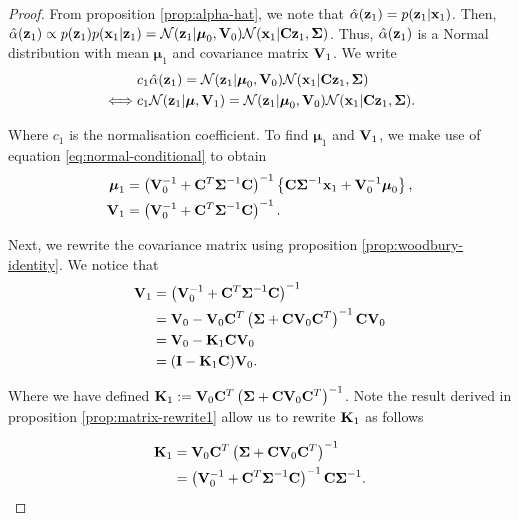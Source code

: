 \documentclass[11pt]{article}
\numberwithin{equation}{section}
\newcommand{\x}{{\bf x}}
\newcommand{\z}{{\bf z}}
\newcommand{\N}{\mathcal{N}}
\begin{document}
\begin{proof}
	From proposition \ref{prop:alpha-hat}, we note that $\hat\alpha(\z_1) = p(\z_1\vert\x_1)$. Then, $\hat\alpha(\z_1) \propto p(\z_1)p(\x_1\vert\z_1) = \N(\z_1 \vert \boldsymbol\mu_0, {\bf V}_0) \N(\x_1\vert {\bf C}\z_1, \boldsymbol\Sigma)$. Thus, $\hat\alpha(\z_1)$ is a Normal distribution with mean $\boldsymbol{\mu}_1$ and covariance matrix ${\bf V}_1$. We write
	\begin{align}
		&c_1 \hat\alpha(\z_1) = \N(\z_1 \vert \boldsymbol\mu_0, {\bf V}_0) \N(\x_1\vert {\bf C}\z_1, \boldsymbol\Sigma)\\
		\iff& c_1 \N(\z_1\vert \boldsymbol\mu, {\bf V}_1) = \N(\z_1 \vert \boldsymbol\mu_0, {\bf V}_0) \N(\x_1\vert {\bf C}\z_1, \boldsymbol\Sigma).
	\end{align}
	
	Where $c_1$ is the normalisation coefficient. To find $\boldsymbol{\mu}_1$ and ${\bf V}_1$, we make use of equation \eqref{eq:normal-conditional} to obtain
	\begin{align}
		\boldsymbol{\mu}_1 &= \left({\bf V}_0^{-1} + {\bf C}^T\boldsymbol{\Sigma}^{-1} {\bf C}\right)^{-1} \left\{{\bf C}\boldsymbol\Sigma^{-1}\x_1 + {\bf V}_0^{-1}\boldsymbol\mu_0\right\},\\
		{\bf V}_1 &= \left({\bf V}_0^{-1} + {\bf C}^T\boldsymbol{\Sigma}^{-1} {\bf C}\right)^{-1}.
	\end{align}
	
	Next, we rewrite the covariance matrix using proposition \ref{prop:woodbury-identity}. We notice that 
	\begin{align}
		{\bf V}_1 &= \left({\bf V}_0^{-1} + {\bf C}^T\boldsymbol{\Sigma}^{-1} {\bf C}\right)^{-1}\\
		&= {\bf V}_0 - {\bf V}_0 {\bf C}^T\left(\boldsymbol\Sigma + {\bf C}{\bf V}_0{\bf C}^T\right)^{-1}{\bf C}{\bf V}_0 \\
		&= {\bf V}_0 - {\bf K}_1{\bf C}{\bf V}_0\\
		&= ({\bf I} - {\bf K}_1{\bf C}){\bf V}_0. \label{eq:part-v1-rewrite}
	\end{align}
	
	Where we have defined ${\bf K}_1 := {\bf V}_0 {\bf C}^T\left(\boldsymbol\Sigma + {\bf C}{\bf V}_0{\bf C}^T\right)^{-1}$. Note the result derived in proposition \ref{prop:matrix-rewrite1} allow us to rewrite ${\bf K}_1$ as follows
	
	\begin{align}
		{\bf K}_1 &= {\bf V}_0 {\bf C}^T\left(\boldsymbol\Sigma + {\bf C}{\bf V}_0{\bf C}^T\right)^{-1}\\
				  &= \left({\bf V}_0^{-1} + {\bf C}^T \boldsymbol\Sigma^{-1}{\bf C}\right)^{-1}{\bf C}\boldsymbol{\Sigma}^{-1}. \label{eq:part-k1-rewrite}
	\end{align}
	

\end{proof}
\end{document}

